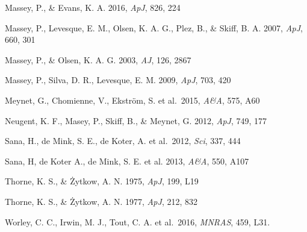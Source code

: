 \documentclass{iau}
\begin{document}
\begin{thebibliography}{}
\bibitem[]{}Massey, P., \& Evans, K. A. 2016, \textit{ApJ}, 826, 224

\bibitem[]{}Massey, P., Levesque, E. M., Olsen, K. A. G., Plez, B., \& Skiff, B. A. 2007, \textit{ApJ}, 660, 301

\bibitem[]{}Massey, P., \& Olsen, K. A. G. 2003, \textit{AJ}, 126, 2867

\bibitem[]{}Massey, P., Silva, D. R., Levesque, E. M. 2009, \textit{ApJ}, 703, 420

\bibitem[]{}
Meynet, G., Chomienne, V., Ekstr\"{o}m, S. et al.\  2015, \textit{A\&A}, 575, A60

\bibitem[]{}Neugent, K. F., Masey, P., Skiff, B., \& Meynet, G. 2012, \textit{ApJ}, 749, 177

\bibitem[]{}Sana, H., de Mink, S. E., de Koter, A. et al.\ 2012, \textit{Sci}, 337, 444

{Sana, H, de Koter A., de Mink, S. E. et al.} 2013, \textit{A\&A}, 550, A107

\bibitem[]{}Thorne, K. S., \& \.{Z}ytkow, A. N. 1975, \textit{ApJ}, 199, L19

\bibitem[]{}Thorne, K. S., \& \.{Z}ytkow, A. N. 1977, \textit{ApJ}, 212, 832

\bibitem[]{}Worley, C. C., Irwin, M. J., Tout, C. A. et al.\ 2016,
\textit{MNRAS}, 459, L31.

\end{thebibliography}
\end{document}
